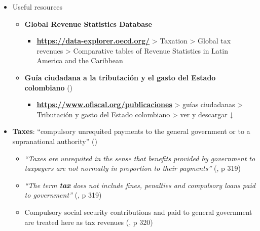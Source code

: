 \documentclass[
  ignorenonframetext,
  english,
]{beamer}
\providecommand{\tightlist}{%
  \setlength{\itemsep}{0pt}\setlength{\parskip}{0pt}}\usepackage{longtable,booktabs,array}
\begin{document}
\begin{frame}{}
\label{section-12}
\begin{itemize}
\item
  Useful resources

  \begin{itemize}
  \item
    \textbf{Global Revenue Statistics Database}

    \begin{itemize}
    \tightlist
    \item
      \href{https://data-explorer.oecd.org/}{\textbf{https://data-explorer.oecd.org/}}
      \textgreater{} Taxation \textgreater{} Global tax revenues
      \textgreater{} Comparative tables of Revenue Statistics in Latin
      America and the Caribbean
    \end{itemize}
  \item
    \textbf{Guía ciudadana a la tributación y el gasto del Estado
    colombiano}
    ()

    \begin{itemize}
    \tightlist
    \item
      \href{https://www.ofiscal.org/publicaciones}{\textbf{https://www.ofiscal.org/publicaciones}}
      \textgreater{} guías ciudadanas \textgreater{} Tributación y gasto
      del Estado colombiano \textgreater{} ver y descargar ↓
    \end{itemize}
  \end{itemize}
\end{itemize}
\end{frame}

\begin{frame}{}
\label{section-13}
\begin{itemize}
\item
  \textbf{Taxes}: ``compulsory unrequited payments to the general
  government or to a supranational authority''
  ()

  \begin{itemize}
  \item
    \emph{``Taxes are unrequited in the sense that benefits provided by
    government to taxpayers are not normally in proportion to their
    payments''} (, p 319)
  \item
    \emph{``The term \textbf{tax} does not include fines, penalties and
    compulsory loans paid to government''}
    (, p 319)
  \item
    Compulsory social security contributions and paid to general
    government are treated here as tax revenues
    (, p 320)
  \end{itemize}
\end{itemize}
\end{frame}
\end{document}
